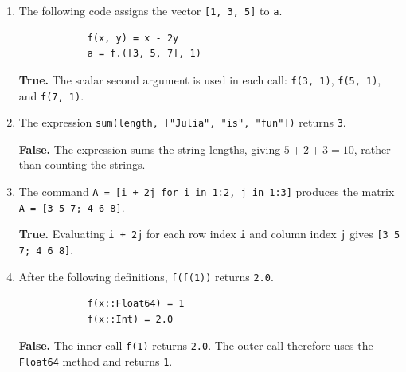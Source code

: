 \documentclass[a4paper]{article}
\newcommand{\julia}[1]{\texttt{#1}}
\newcommand{\answer}[1]{%
    \ifdefined\showsolutions
        \par\smallskip
        {\small\color{blue!60!black}#1\par}
    \fi
}
\begin{document}
\begin{enumerate}[itemsep=8pt]
    \item
        The following code assigns the vector \julia{[1, 3, 5]} to \julia{a}.
        \begin{verbatim}
            f(x, y) = x - 2y
            a = f.([3, 5, 7], 1)
        \end{verbatim}
        \answer{\textbf{True.}
        The scalar second argument is used in each call:
        \julia{f(3, 1)}, \julia{f(5, 1)}, and \julia{f(7, 1)}.}

    \item
        The expression \julia{sum(length, ["Julia", "is", "fun"])} returns \julia{3}.
        \answer{\textbf{False.}
        The expression sums the string lengths,
        giving $5+2+3=10$, rather than counting the strings.}

    \item
        The command \julia{A = [i + 2j for i in 1:2, j in 1:3]}
        produces the matrix \julia{A = [3 5 7; 4 6 8]}.
        \answer{\textbf{True.}
        Evaluating \julia{i + 2j} for each row index
        \julia{i} and column index \julia{j} gives \julia{[3 5 7; 4 6 8]}.}

    \item
        After the following definitions, \julia{f(f(1))} returns \julia{2.0}.
        \begin{verbatim}
            f(x::Float64) = 1
            f(x::Int) = 2.0
        \end{verbatim}
        \answer{\textbf{False.}
        The inner call \julia{f(1)} returns \julia{2.0}.
        The outer call therefore uses the \julia{Float64} method and returns \julia{1}.}
\end{enumerate}
\end{document}

